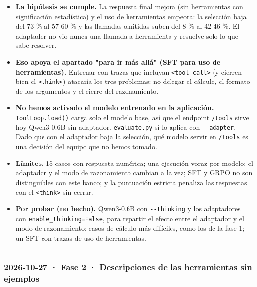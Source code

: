 \begin{itemize}
\tightlist
\item
  \textbf{La hipótesis se cumple.} La respuesta final mejora (sin herramientas con significación
  estadística) y el uso de herramientas empeora: la selección baja del 73 \% al 57-60 \% y las
  llamadas omitidas suben del 8 \% al 42-46 \%. El adaptador no vio nunca una llamada a herramienta
  y resuelve solo lo que sabe resolver.
\item
  \textbf{Eso apoya el apartado "para ir más allá" (SFT para uso de herramientas).} Entrenar con trazas
  que incluyan \texttt{\textless{}tool\_\allowbreak{}call\textgreater{}} (y cierren bien el \texttt{\textless{}think\textgreater{}}) atacaría los tres problemas: no
  delegar el cálculo, el formato de los argumentos y el cierre del razonamiento.
\item
  \textbf{No hemos activado el modelo entrenado en la aplicación.} \texttt{ToolLoop.load()} carga solo el
  modelo base, así que el endpoint \texttt{/\allowbreak{}tools} sirve hoy Qwen3-0.6B sin adaptador. \texttt{evaluate.py} sí
  lo aplica con \texttt{-\/\allowbreak{}-adapter}. Dado que con el adaptador baja la selección, qué modelo servir en
  \texttt{/\allowbreak{}tools} es una decisión del equipo que no hemos tomado.
\item
  \textbf{Límites.} 15 casos con respuesta numérica; una ejecución voraz por modelo; el adaptador y el
  modo de razonamiento cambian a la vez; SFT y GRPO no son distinguibles con este banco; y la
  puntuación estricta penaliza las respuestas con el \texttt{\textless{}think\textgreater{}} sin cerrar.
\item
  \textbf{Por probar (no hecho).} Qwen3-0.6B con \texttt{-\/\allowbreak{}-thinking} y los adaptadores con
  \texttt{enable\_\allowbreak{}thinking=\allowbreak{}False}, para repartir el efecto entre el adaptador y el modo de razonamiento;
  casos de cálculo más difíciles, como los de la fase 1; un SFT con trazas de uso de herramientas.
\end{itemize}

\begin{center}\rule{0.5\linewidth}{0.5pt}\end{center}

\subsubsection{2026-10-27 · Fase 2 · Descripciones de las herramientas sin ejemplos}

